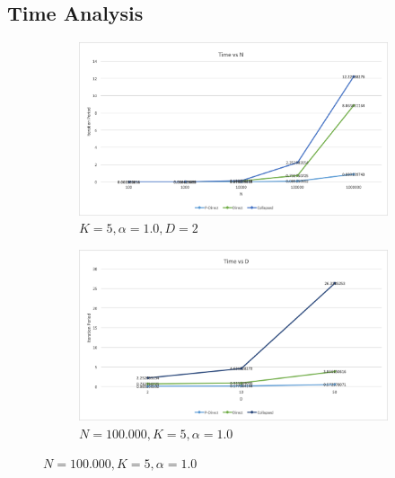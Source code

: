 \documentclass[a4paper]{article}
\begin{document}
\subsection{Time Analysis}

\begin{figure}[H]
  \begin{subfigure}[t]{.4\textwidth}
    \centering
    \includegraphics[width=\linewidth]{img/NVK5K5alpha1D2.png}
    \caption{$K=5, \alpha=1.0, D=2$}
  \end{subfigure}
  \hfill
  \begin{subfigure}[t]{.4\textwidth}
    \centering
    \includegraphics[width=\linewidth]{img/N100000K5K5alpha1DV.png}
     \caption{$N=100.000, K=5, \alpha=1.0$}
  \end{subfigure}

  \medskip


\end{figure}
\end{document}
